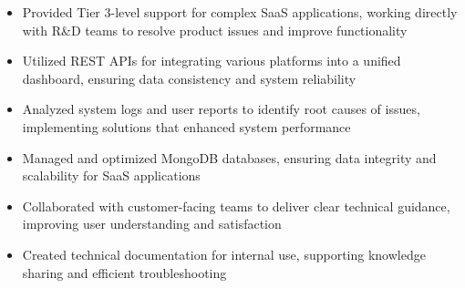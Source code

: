 \par\smallskip
\noindent
\begin{minipage}{20cm}
  \begin{minipage}{9.75cm}
    \begin{itemize}
      \item Provided Tier 3-level support for complex SaaS applications, working directly with R&D teams to resolve product issues and improve functionality
      \item Utilized REST APIs for integrating various platforms into a unified dashboard, ensuring data consistency and system reliability
      \item Analyzed system logs and user reports to identify root causes of issues, implementing solutions that enhanced system performance
    \end{itemize}
  \end{minipage}
  \hfill
  \begin{minipage}{9.75cm}
    \begin{itemize}
      \item Managed and optimized MongoDB databases, ensuring data integrity and scalability for SaaS applications
      \item Collaborated with customer-facing teams to deliver clear technical guidance, improving user understanding and satisfaction
      \item Created technical documentation for internal use, supporting knowledge sharing and efficient troubleshooting
    \end{itemize}
  \end{minipage}
\end{minipage}
\par\smallskip
\divider

